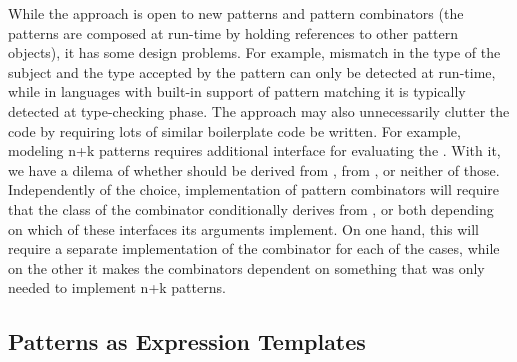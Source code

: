 While the approach is open to new patterns and pattern combinators (the patterns 
are composed at run-time by holding references to other pattern objects), it has 
some design problems. For example, mismatch in the type of the subject and the 
type accepted by the pattern can only be detected at run-time, while in 
languages with built-in support of pattern matching it is typically detected at 
type-checking phase. The approach may also unnecessarily clutter the code by 
requiring lots of similar boilerplate code be written. For example, modeling n+k 
patterns requires additional interface for evaluating the . 
With it, we have a dilema of whether  should be derived from 
,  from , or neither of those. 
Independently of the choice, implementation of pattern combinators will require 
that the class of the combinator conditionally derives from , 
 or both depending on which of these interfaces its arguments 
implement. On one hand, this will require a separate implementation of the 
combinator for each of the cases, while on the other it makes the combinators 
dependent on something that was only needed to implement n+k patterns.


\subsection{Patterns as Expression Templates}
\label{sec:pat}

